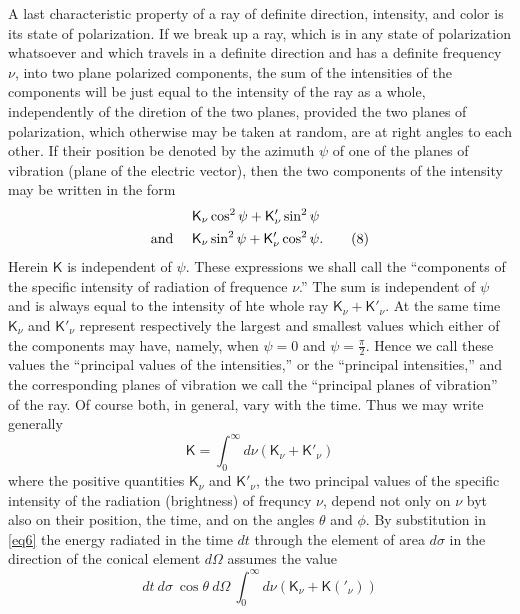 \documentclass[12pt,oneside]{book}
\begin{document}
A last characteristic property of a ray of definite direction, intensity, and color is its state of polarization. If we break up a ray, which is in any state of polarization whatsoever and which travels in a definite direction and has a definite frequency $\nu$, into two plane polarized components, the sum of the intensities of the components will be just equal to the intensity of the ray as a whole, independently of the diretion of the two planes, provided the two planes of polarization, which otherwise may be taken at random, are at right angles to each other. If their position be denoted by the azimuth $\psi$ of one of the planes of vibration (plane of the electric vector), then the two components of the intensity may be written in the form 
\begin{align*}
    &\mathsf{K}_\nu \cos^2\psi+\mathsf{K}'_\nu\sin^2\psi \\ 
    \text{and }\quad &\mathsf{K}_\nu\sin^2\psi+\mathsf{K}'_\nu\cos^2\psi.
    \tag{8}
    \label{eq8}
    \setcounter{equation}{8}
\end{align*}
Herein $\mathsf{K}$ is independent of $\psi$. These expressions we shall call the ``components of the specific intensity of radiation of frequence $\nu$.'' The sum is independent of $\psi$ and is always equal to the intensity of hte whole ray $\mathsf{K}_\nu+\mathsf{K}'_\nu$. At the same time $\mathsf{K}_\nu$ and $\mathsf{K}'_\nu$ represent respectively the largest and smallest values which either of the components may have, namely, when $\psi=0$ and $\psi=\frac{\pi}{2}$. Hence we call these values the ``principal values of the intensities,'' or the ``principal intensities,'' and the corresponding planes of vibration we call the ``principal planes of vibration'' of the ray. Of course both, in general, vary with the time. Thus we may write generally 
\begin{equation}  
    \mathsf{K}=\int_0^\infty d\nu(\mathsf{K}_\nu+\mathsf{K}'_\nu)
    \label{eq9}
\end{equation}
where the positive quantities $\mathsf{K}_\nu$ and $\mathsf{K}'_\nu$, the two principal values of the specific intensity of the radiation (brightness) of frequncy $\nu$, depend not only on $\nu$ byt also on their position, the time, and on the angles $\theta$ and $\phi$. By substitution in \eqref{eq6} the energy radiated in the time $dt$ through the element of area $d\sigma$ in the direction of the conical element $d\Omega$ assumes the value 
\begin{equation}
    dt\ d\sigma\ \cos\theta\ d\Omega\ \int_0^\infty d\nu(\mathsf{K}_\nu+\mathsf{K}('_\nu))
    \label{eq10}
\end{equation}
\end{document}
